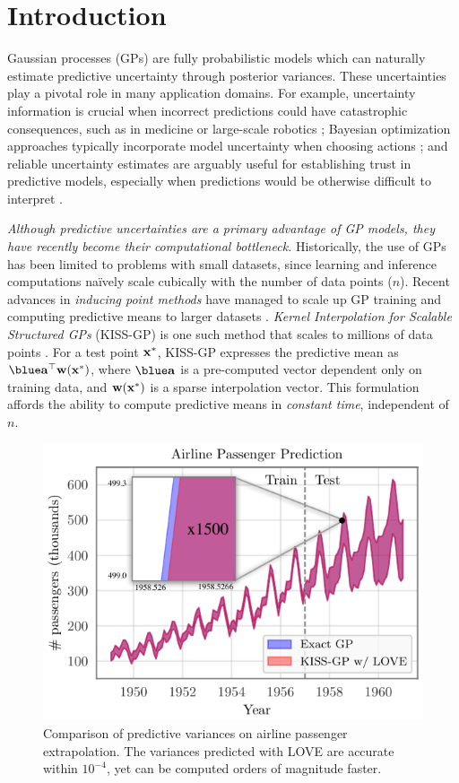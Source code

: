 \section{Introduction}
Gaussian processes (GPs) are fully probabilistic models which can naturally estimate predictive uncertainty through posterior variances.
These uncertainties play a pivotal role in many application domains.
For example, uncertainty information is crucial when incorrect predictions could have catastrophic consequences, such as in medicine \cite{schulam2017if} or large-scale robotics \cite{deisenroth2015gaussian};
Bayesian optimization approaches typically incorporate model uncertainty when choosing actions \cite{snoek2012practical,deisenroth2011pilco,wang2017max};
and reliable uncertainty estimates are arguably useful for establishing trust in predictive models,
especially when predictions would be otherwise difficult to interpret
\cite{doshi2017roadmap,zhou2017effects}.

\emph{Although predictive uncertainties are a primary advantage of GP models, they have recently become their computational bottleneck.}
Historically, the use of GPs has been limited to problems with small datasets, since learning and inference computations na\"ively scale cubically with the number of data points ($n$).
Recent advances in \emph{inducing point methods} have managed to scale up GP training and computing predictive means to larger datasets \cite{snelson2006sparse,quinonero2005unifying,titsias2009variational}.
\emph{Kernel Interpolation for Scalable Structured GPs} (KISS-GP) is one such method that scales to millions of data points \cite{wilson2015kernel,wilson2015thoughts}.
For a test point $\mathbf{x}^*$, KISS-GP expresses the predictive mean as ${\blue\ba^\top} \bw(\bx^*) $, where $\blue \ba$ is a pre-computed vector dependent only on training data, and $\mathbf{w}(\mathbf{x}^*)$ is a sparse interpolation vector.
This formulation affords the ability to compute predictive means in \emph{constant time}, independent of $n$.

\begin{figure}[t!]
  \centering
  \includegraphics[width=0.8\columnwidth]{figures/airline_comparison.pdf}
  \caption{
    Comparison of predictive variances on airline passenger extrapolation.
    The variances predicted with LOVE{} are accurate within $10^{-4}$, yet can be computed orders of magnitude faster.
    \label{fig:airline_results}
  }
\end{figure}

